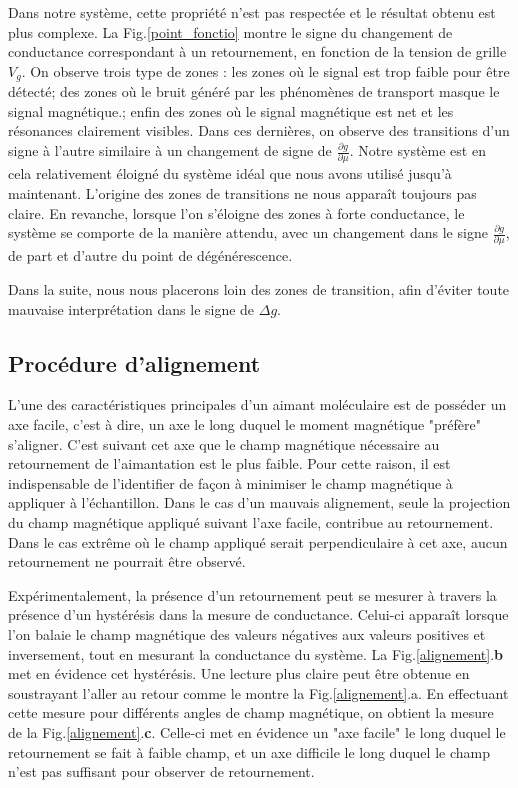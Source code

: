 Dans notre système, cette propriété n'est pas respectée et le résultat obtenu est plus complexe. La Fig.\ref{point_fonctio} montre le signe du changement de conductance correspondant à un retournement, en fonction de la tension de grille $V_g$. On observe trois type de zones : les zones où le signal est trop faible pour être détecté; des zones où le bruit généré par les phénomènes de transport masque le signal magnétique.; enfin des zones où le signal magnétique est net et les résonances clairement visibles. Dans ces dernières, on observe des transitions d'un signe à l'autre similaire à un changement de signe de $\frac{\partial g}{\partial \mu}$. Notre système est en cela relativement éloigné du système idéal que nous avons utilisé jusqu'à maintenant. L'origine des zones de transitions ne nous apparaît toujours pas claire. En revanche, lorsque l'on s'éloigne des zones à forte conductance, le système se comporte de la manière attendu, avec un changement dans le signe $\frac{\partial g}{\partial \mu}$, de part et d'autre du point de dégénérescence.

Dans la suite, nous nous placerons loin des zones de transition, afin d'éviter toute mauvaise interprétation dans le signe de $\Delta g$.


\subsection{Procédure d'alignement}

L'une des caractéristiques principales d'un aimant moléculaire est de posséder un axe facile, c'est à dire, un axe le long duquel le moment magnétique "préfère" s'aligner. C'est suivant cet axe que le champ magnétique nécessaire au retournement de l'aimantation est le plus faible. Pour cette raison, il est indispensable de l'identifier de façon à minimiser le champ magnétique à appliquer à l'échantillon. Dans le cas d'un mauvais alignement, seule la projection du champ magnétique appliqué suivant l'axe facile,  contribue au retournement. Dans le cas extrême où le champ appliqué serait perpendiculaire à cet axe, aucun retournement ne pourrait être observé.

Expérimentalement, la présence d'un retournement peut se mesurer à travers la présence d'un hystérésis dans la mesure de conductance. Celui-ci apparaît lorsque l'on balaie le champ magnétique des valeurs négatives aux valeurs positives et inversement, tout en mesurant la conductance du système. La Fig.\ref{alignement}.\textbf{b} met en évidence cet hystérésis. Une lecture plus claire peut être obtenue en soustrayant l'aller au retour comme le montre la Fig.\ref{alignement}.a. En effectuant cette mesure pour différents angles de champ magnétique, on obtient la mesure de la Fig.\ref{alignement}.\textbf{c}. Celle-ci met en évidence un "axe facile" le long duquel le retournement se fait à faible champ, et un axe difficile le long duquel le champ n'est pas suffisant pour observer de retournement.

